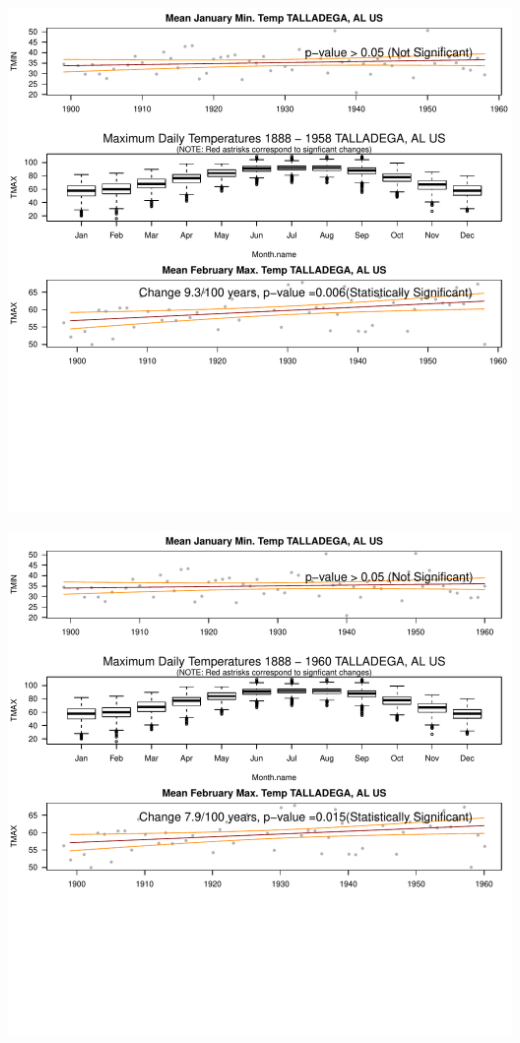 \documentclass{article}\usepackage[]{graphicx}\usepackage[]{color}
\makeatletter
\def\maxwidth{ %
  \ifdim\Gin@nat@width>\linewidth
    \linewidth
  \else
    \Gin@nat@width
  \fi
}
\newenvironment{knitrout}{}{} %
\makeatother
\begin{document}
\begin{knitrout}
\includegraphics[width=\maxwidth]{figure/static_template-25} 

\includegraphics[width=\maxwidth]{figure/static_template-26} 


\end{knitrout}
\end{document}
